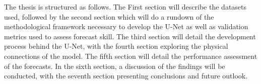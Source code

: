 \documentclass[../main/thesis.tex]{subfiles}
\begin{document}
The thesis is structured as follows. The First section will describe the datasets used, followed by the second section which will do a rundown of the methodological framework necessary to develop the U-Net as well as validation metrics used to assess forecast skill. The third section will detail the development process behind the U-Net, with the fourth section exploring the physical connections of the model. The fifth section will detail the performance assessment of the forecasts. In the sixth section, a discussion of the findings will be conducted, with the seventh section presenting conclusions and future outlook. 





\biblio
\end{document}
